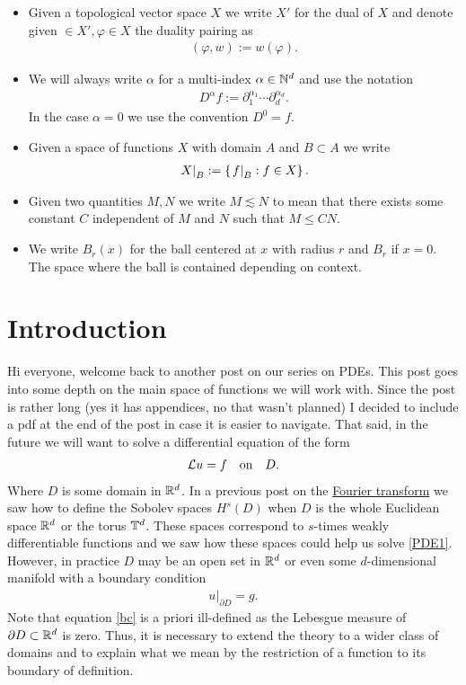 \documentclass[12pt]{article}
\theoremstyle{remark}
\newcommand\restr[2]{\left.#1\right|_{#2}}
\begin{document}
\begin{itemize}
	\item Given a topological vector space $X$ we write $X'$ for the dual of  $X $ and denote given  $ \in X', \varphi \in X$ the duality pairing as
	      \begin{align*}
		      (\varphi,w):= w(\varphi) .
	      \end{align*}
	\item We will always write $\alpha$ for a multi-index $\alpha \in \mathbb{N}^d$ and use the notation
	      \begin{align*}
		      D^\alpha f := \partial _1^{\alpha_1}\cdots \partial _d^{\alpha_d}.
	      \end{align*}
	      In the case $\alpha =0$ we use the convention $D^0 =f$.
	\item Given  a space of functions $X$ with domain $A$ and $B \subset A $ we write
	      \begin{align*}
		      \restr{X}{B}:=\set{\restr{f}{B}: f\in X} .
	      \end{align*}
	\item Given two quantities $M,N$ we write $M \lesssim N$ to mean that there exists some constant $C$ independent of  $M$ and  $N$ such that  $M \leq C N$.
	\item We write $B_r(x)$ for the ball centered at  $x$ with radius  $r$ and  $B_r$ if $x=0$. The space where the ball is contained depending on context.

\end{itemize}
\section{Introduction}
Hi everyone, welcome back to another post on our series on PDEs. This post goes into some depth on the main space of functions we will work with. Since the post is rather long (yes it has appendices, no that wasn't planned) I decided to include a pdf at the end of the post in case it is easier to navigate. That said, in the future we will want to solve a differential equation of the form
\begin{align}\label{PDE1}
	\mathcal{L} u = f\quad  \mathrm{ on  }\quad  D .
\end{align}
Where $D$ is some domain in $\mathbb{R}^d$. In a previous post on the \href{https://nowheredifferentiable.com/2023-01-29-PDE-1-Fourier/#:~:text=Sobolev%20spaces-,Sobolev,-spaces%20form%20a}{Fourier transform} we saw how to define the Sobolev spaces $H^s(D)$ when $D$ is the whole Euclidean space $\mathbb{R}^d$ or the torus $\mathbb{T}^d$. These spaces correspond to $s$-times weakly differentiable functions and we saw how these spaces could help us solve \eqref{PDE1}. However, in practice $D$ may be an open set in $\mathbb{R}^d$ or even some $d$-dimensional manifold with a boundary condition
\begin{align}\label{bc}
	\restr{u}{\partial  D}= g.
\end{align}
Note that equation \eqref{bc} is a priori ill-defined as the Lebesgue measure of $\partial D \subset \mathbb{R}^d $ is zero.     Thus, it is necessary to extend the theory to a wider class of domains and to explain what we mean by the restriction of a function to its boundary of definition.
\end{document}
